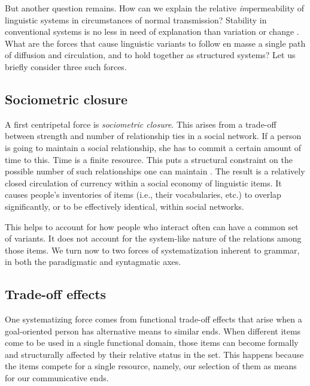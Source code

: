 But another question remains. How can we explain the relative \textit{im}permeability of linguistic systems in circumstances of normal transmission? Stability in conventional systems is no less in need of 
explanation than variation or change \citep{bourdieu_outline_1977,sperber_explaining_1996,sperber_cognitive_2004}. What are the forces that cause linguistic variants to follow en masse a single path of diffusion 
and circulation, and to hold together as structured systems? Let us briefly 
consider three such forces.



\subsection{Sociometric closure}
\label{sociometricclosure}


A first centripetal force is \textit{sociometric closure}. This arises from a trade-off between strength and number of relationship ties in a 
social network. If a person is going to maintain a social relationship, she 
has to commit a certain amount of time to this. Time is a 
finite resource. This puts a structural constraint on the possible 
number of such relationships one can maintain \citep{hill_social_2003}. 
The result is a relatively closed circulation of currency within a 
social economy of linguistic items. It causes people's inventories of 
items (i.e., their vocabularies, etc.) to overlap significantly, or to 
be effectively identical, within social networks.



This helps to account for how people who interact often
can have a common set of variants. It does not account for the 
system-like nature of the relations among those items. We 
turn now to two forces of systematization inherent 
to grammar, in both the paradigmatic and syntagmatic axes.



\subsection{Trade-off effects}
\label{tradeoff}

One systematizing force comes from functional trade-off effects that 
arise when a goal-oriented person has alternative means to similar ends. When different items come to be used 
in a single functional domain, those items can become formally and 
structurally affected by their relative status in the set. This happens 
because the items compete for a single resource, namely, our selection of 
them as means for our communicative ends. 



